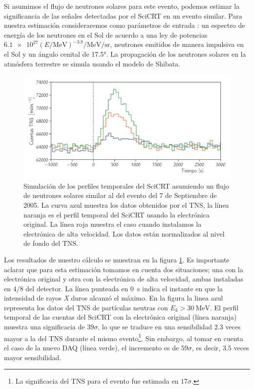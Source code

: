 Si asumimos el flujo de neutrones solares para este evento, podemos estimar la significancia de las señales detectadas por el SciCRT en un evento similar. Para nuestra estimación consideraremos como parámetros de entrada \cite{ynagai14}: un espectro de energía de los neutrones en el Sol de acuerdo a una ley de potencias
$\num{6.1e27}\left(E/\si{\mega\electronvolt}\right)^{-3.8}\si{\per\mega\electronvolt\per\steradian}$, neutrones emitidos de manera impulsiva en el Sol y un ángulo cenital de \ang{17.5}. La propagación de los neutrones solares en la atmósfera terrestre se simula usando el modelo de Shibata.

\begin{figure}
\centering
  \includegraphics[width=\textwidth]{scicrt-sim.pdf}
  \caption{Simulación de los perfiles temporales del SciCRT asumiendo un flujo de neutrones solares similar al del evento del \num{7} de Septiembre de \num{2005}. La curva azul muestra los datos obtenidos por el TNS, la línea naranja es el perfil temporal del SciCRT usando la electrónica original. La línea roja muestra el caso cuando instalamos la electrónica de alta velocidad. Los datos están normalizados al nivel de fondo del TNS.}
  \label{fig:solar-sim}
\end{figure}

Los resultados de nuestro cálculo se muestran en la figura \ref{fig:solar-sim}. Es importante aclarar que para esta estimación tomamos en cuenta dos situaciones; una con la electrónica original y otra con la electrónica de alta velocidad, ambas instaladas en $4/8$ del detector. La línea punteada en \SI{0}{\second} indica el instante en que la intensidad de rayos \emph{X} duros alcanzó el máximo. En la figura la linea azul representa los datos del TNS de partículas neutras con $E_{k}>\SI{30}{\mega\electronvolt}$. El perfil temporal de las cuentas del SciCRT con la electrónica original (línea naranja) muestra una significacia de $39\sigma$, lo que se traduce en una sensibilidad $2.3$ veces mayor a la del TNS durante el mismo evento\footnote{La significacia del TNS para el evento fue estimada en $17\sigma$.}. Sin embargo, al tomar en cuenta el caso de la nuevo DAQ (línea verde), el incremento es de $59\sigma$, es decir, $3.5$ veces mayor sensibilidad.

